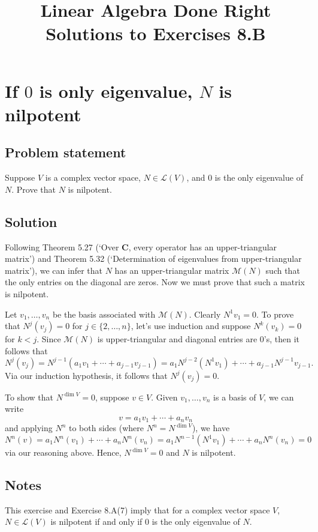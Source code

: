 \documentclass{article}
\title{Linear Algebra Done Right\\Solutions to Exercises 8.B}
\author{}
\date{}
\begin{document}
\maketitle

\section{If $0$ is only eigenvalue, $N$ is nilpotent}
\subsection*{Problem statement}
Suppose $V$ is a complex vector space, $N\in\mathcal{L}(V)$, and $0$ is the only eigenvalue of $N$. Prove that $N$ is nilpotent.

\subsection*{Solution}
Following Theorem 5.27 (`Over $\mathbf{C}$, every operator has an upper-triangular matrix') and Theorem 5.32 (`Determination of eigenvalues from upper-triangular matrix'), we can infer that $N$ has an upper-triangular matrix $\mathcal{M}(N)$ such that the only entries on the diagonal are zeros. Now we must prove that such a matrix is nilpotent.

Let $v_1,\ldots,v_n$ be the basis associated with $\mathcal{M}(N)$. Clearly $N^1v_1=0$. To prove that $N^j(v_j)=0$ for $j\in\{2,\ldots,n\}$, let's use induction and suppose $N^k(v_k)=0$ for $k<j$. Since $\mathcal{M}(N)$ is upper-triangular and diagonal entries are $0$'s, then it follows that 
\[N^j(v_j)=N^{j-1}(a_1v_1+\cdots+a_{j-1}v_{j-1})=a_1N^{j-2}(N^1v_1)+\cdots+a_{j-1}N^{j-1}v_{j-1}.\]
Via our induction hypothesis, it follows that $N^j(v_j)=0$.

To show that $N^{\operatorname{dim}V}=0$, suppose $v\in V$. Given $v_1,\ldots,v_n$ is a basis of $V$, we can write
\[v=a_1v_1+\cdots+a_nv_n\]
and applying $N^n$ to both sides (where $N^n=N^{\operatorname{dim}V}$), we have
\[N^n(v)=a_1N^n(v_1)+\cdots+a_nN^n(v_n)=a_1N^{n-1}(N^1v_1)+\cdots+a_nN^n(v_n)=0\]
via our reasoning above. Hence, $N^{\operatorname{dim}V}=0$ and $N$ is nilpotent.

\subsection*{Notes}
This exercise and Exercise 8.A(7) imply that for a complex vector space $V$, $N\in\mathcal{L}(V)$ is nilpotent if and only if $0$ is the only eigenvalue of $N$.
\end{document}
